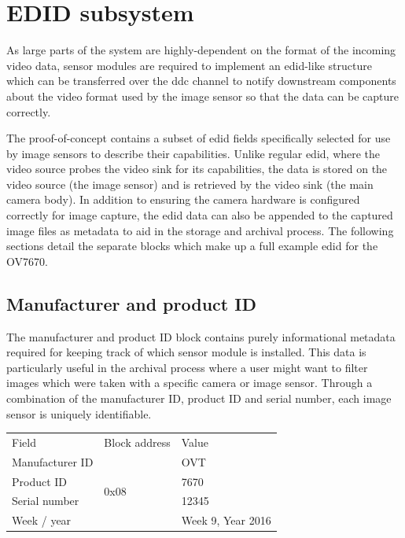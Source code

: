 \section{EDID subsystem}
\label{sec:edid}

As large parts of the system are highly-dependent on the format of the incoming video data, sensor modules are required to implement an \gls{edid}-like structure which can be transferred over the \gls{ddc} channel to notify downstream components about the video format used by the image sensor so that the data can be capture correctly.

The proof-of-concept contains a subset of \gls{edid} fields specifically selected for use by image sensors to describe their capabilities. Unlike regular \gls{edid}, where the video source probes the video sink for its capabilities, the data is stored on the video source (the image sensor) and is retrieved by the video sink (the main camera body). In addition to ensuring the camera hardware is configured correctly for image capture, the \gls{edid} data can also be appended to the captured image files as metadata to aid in the storage and archival process. The following sections detail the separate blocks which make up a full example \gls{edid} for the OV7670.

\subsection{Manufacturer and product ID}
The manufacturer and product ID block contains purely informational metadata required for keeping track of which sensor module is installed. This data is particularly useful in the archival process where a user might want to filter images which were taken with a specific camera or image sensor. Through a combination of the manufacturer ID, product ID and serial number, each image sensor is uniquely identifiable.  

\begin{table}
    \begin{tabular}{lll}
        Field               & Block address             & Value             \\
        Manufacturer ID     & \multirow{5}{*}{0x08}     & OVT               \\
        Product ID          &                           & 7670              \\
        Serial number       &                           & 12345             \\
        Week / year         &                           & Week 9, Year 2016 \\
    \end{tabular}
\end{table}

